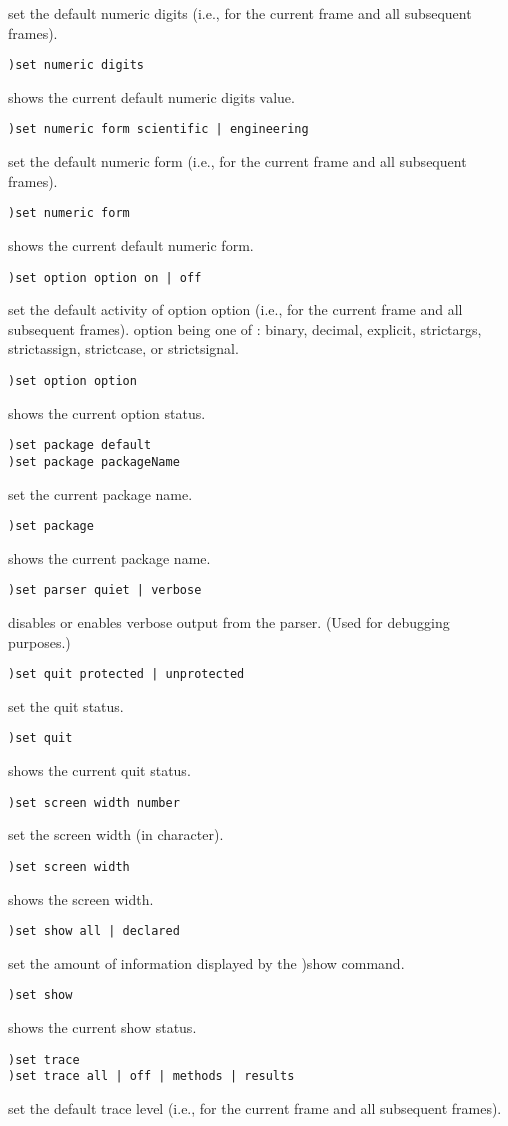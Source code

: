 set the default numeric digits (i.e., for the current frame and all subsequent frames).
\begin{verbatim}
)set numeric digits
\end{verbatim}
shows the current default numeric digits value.
\begin{verbatim}
)set numeric form scientific | engineering
\end{verbatim}
set the default numeric form (i.e., for the current frame and all subsequent frames).
\begin{verbatim}
)set numeric form
\end{verbatim}
shows the current default numeric form.
\begin{verbatim}
)set option option on | off
\end{verbatim}
set the default activity of option option (i.e., for the current frame and all subsequent frames). option being one of : binary, decimal, explicit, strictargs, strictassign, strictcase, or strictsignal.
\begin{verbatim}
)set option option
\end{verbatim}
shows the current option status.
\begin{verbatim}
)set package default
)set package packageName
\end{verbatim}

set the current package name.
\begin{verbatim}
)set package
\end{verbatim}
shows the current package name.
\begin{verbatim}
)set parser quiet | verbose
\end{verbatim}
disables or enables verbose output from the parser. (Used for debugging purposes.)
\begin{verbatim}
)set quit protected | unprotected
\end{verbatim}
set the quit status.
\begin{verbatim}
)set quit
\end{verbatim}
shows the current quit status.
\begin{verbatim}
)set screen width number
\end{verbatim}
set the screen width (in character).
\begin{verbatim}
)set screen width
\end{verbatim}
shows the screen width.
\begin{verbatim}
)set show all | declared
\end{verbatim}
set the amount of information displayed by the )show command.
\begin{verbatim}
)set show
\end{verbatim}
shows the current show status.
\begin{verbatim}
)set trace
)set trace all | off | methods | results
\end{verbatim}
set the default trace level (i.e., for the current frame and all subsequent frames).

